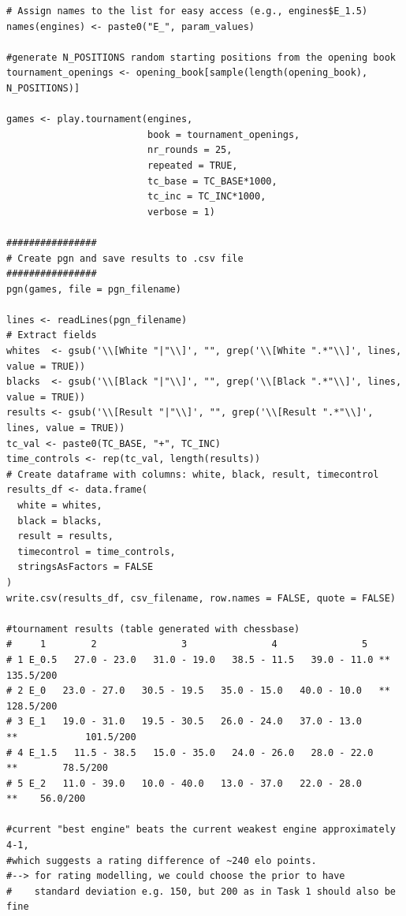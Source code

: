 \documentclass{article}
\begin{document}
\begin{verbatim}
# Assign names to the list for easy access (e.g., engines$E_1.5)
names(engines) <- paste0("E_", param_values)

#generate N_POSITIONS random starting positions from the opening book
tournament_openings <- opening_book[sample(length(opening_book), N_POSITIONS)]

games <- play.tournament(engines,
                         book = tournament_openings,
                         nr_rounds = 25,
                         repeated = TRUE,
                         tc_base = TC_BASE*1000,
                         tc_inc = TC_INC*1000,
                         verbose = 1)

################
# Create pgn and save results to .csv file
################
pgn(games, file = pgn_filename)

lines <- readLines(pgn_filename)
# Extract fields
whites  <- gsub('\\[White "|"\\]', "", grep('\\[White ".*"\\]', lines, value = TRUE))
blacks  <- gsub('\\[Black "|"\\]', "", grep('\\[Black ".*"\\]', lines, value = TRUE))
results <- gsub('\\[Result "|"\\]', "", grep('\\[Result ".*"\\]', lines, value = TRUE))
tc_val <- paste0(TC_BASE, "+", TC_INC)
time_controls <- rep(tc_val, length(results))
# Create dataframe with columns: white, black, result, timecontrol
results_df <- data.frame(
  white = whites, 
  black = blacks, 
  result = results, 
  timecontrol = time_controls, 
  stringsAsFactors = FALSE
)
write.csv(results_df, csv_filename, row.names = FALSE, quote = FALSE)

#tournament results (table generated with chessbase)
#     1	       2	           3	           4	           5	
# 1	E_0.5	27.0 - 23.0   31.0 - 19.0   38.5 - 11.5   39.0 - 11.0 **					135.5/200
# 2	E_0	  23.0 - 27.0   30.5 - 19.5   35.0 - 15.0   40.0 - 10.0	  **				128.5/200
# 3	E_1	  19.0 - 31.0   19.5 - 30.5   26.0 - 24.0   37.0 - 13.0		  **			101.5/200
# 4	E_1.5	11.5 - 38.5   15.0 - 35.0   24.0 - 26.0   28.0 - 22.0			  **		78.5/200
# 5	E_2	  11.0 - 39.0   10.0 - 40.0   13.0 - 37.0   22.0 - 28.0				  **	56.0/200

#current "best engine" beats the current weakest engine approximately 4-1,
#which suggests a rating difference of ~240 elo points.
#--> for rating modelling, we could choose the prior to have
#    standard deviation e.g. 150, but 200 as in Task 1 should also be fine



\end{verbatim}
\end{document}
